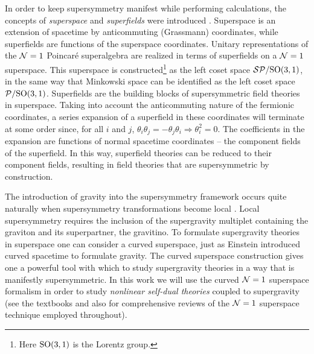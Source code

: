 In order to keep supersymmetry manifest while performing calculations, the concepts of {\it superspace} and {\it superfields} were introduced \cite{Salam:1974yz, Ferrara:1974ac}. Superspace is an extension of spacetime by anticommuting (Grassmann) coordinates, while superfields are functions of the superspace coordinates. Unitary representations of the ${\cal N}=1$ Poincar{\'e} superalgebra are realized in terms of superfields on a ${\cal N}=1$ superspace. This superspace is constructed\footnote{Here ${\rm SO}(3,1)$ is the Lorentz group.} as the left coset space ${\cal SP}/{\rm SO}(3,1)$, in the same way that Minkowski space can be identified as the left coset space ${\cal P}/{\rm SO}(3,1)$. Superfields are the building blocks of supersymmetric field theories in superspace. Taking into account the anticommuting nature of the fermionic coordinates, a series expansion of a superfield in these coordinates will terminate at some order since, for all $i$ and $j$, $\theta_{i}\theta_{j}=-\theta_{j}\theta_{i}\Rightarrow\theta_{i}^{2}=0$. The coefficients in the expansion are functions of normal spacetime coordinates -- the component fields of the superfield. In this way, superfield theories can be reduced to their component fields, resulting in field theories that are supersymmetric by construction.

The introduction of gravity into the supersymmetry framework occurs quite naturally when supersymmetry transformations become local \cite{Freedman:1976xh,Deser:1976eh}. Local supersymmetry requires the inclusion of the supergravity multiplet containing the graviton and its superpartner, the gravitino. To formulate supergravity theories in superspace one can consider a curved superspace, just as Einstein introduced curved spacetime to formulate gravity. The curved superspace construction gives one a powerful tool with which to study supergravity theories in a way that is manifestly supersymmetric. In this work we will use the curved ${\cal N}=1$ superspace formalism in order to study {\it nonlinear self-dual theories} coupled to supergravity (see the textbooks \cite{Gates:1983nr,Bagger:1990qh,Buchbinder:1998qv} and also \cite{West:1986wu,Mohapatra:1986uf,Bailin:1994qt} for comprehensive reviews of the ${\cal N}=1$ superspace technique employed throughout).

\vskip0.5cm
